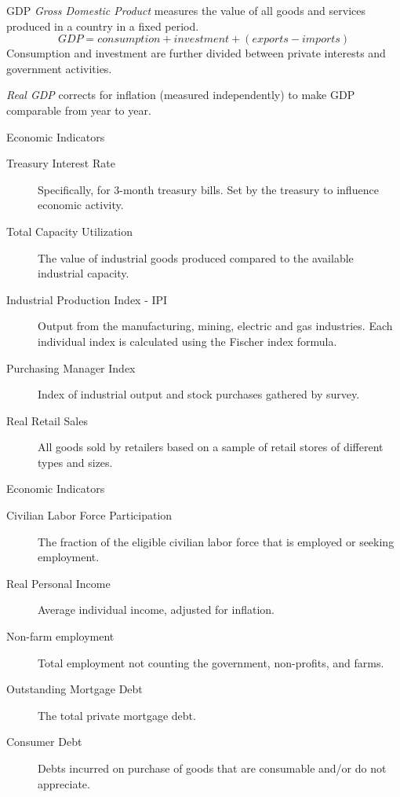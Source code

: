 \begin{frame}{GDP}
    \emph{Gross Domestic Product} measures the value of all goods and
    services produced in a country in a fixed period.
    \[GDP = consumption + investment + (exports - imports)\]
    Consumption and investment are further divided between private
    interests and government activities.

    \emph{Real GDP} corrects for inflation (measured independently) to make
    GDP comparable from year to year.
\end{frame}

\begin{frame}{Economic Indicators}
    \begin{description}
        \item [Treasury Interest Rate]
            Specifically, for 3-month treasury bills.  Set by the treasury to
            influence economic activity.
        \item [Total Capacity Utilization]
            The value of industrial goods produced compared to the available
            industrial capacity.
        \item [Industrial Production Index - IPI]
            Output from the manufacturing, mining, electric and gas industries. 
            Each individual index is calculated using the Fischer index formula.
        \item [Purchasing Manager Index]
            Index of industrial output and stock purchases gathered by survey.
        \item [Real Retail Sales]
            All goods sold by retailers based on a 
            sample of retail stores of different types and sizes.
    \end{description}
\end{frame}

\begin{frame}{Economic Indicators}
    \begin{description}
        \item [Civilian Labor Force Participation]
            The fraction of the eligible civilian labor force that is
            employed or seeking employment.
        \item [Real Personal Income]
            Average individual income, adjusted for inflation.
        \item [Non-farm employment]
            Total employment not counting the government, non-profits, and farms.
        \item [Outstanding Mortgage Debt]
            The total private mortgage debt.
        \item [Consumer Debt]
            Debts incurred on purchase of goods that are consumable and/or 
            do not appreciate.
    \end{description}
\end{frame}

